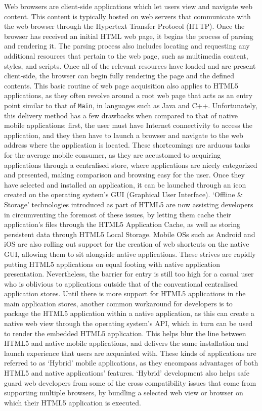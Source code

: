 \documentclass[final]{cmpreport}
\begin{document}
Web browsers are client-side applications which let users view and navigate web content. This content is typically hosted on web servers that communicate with the web browser through the Hypertext Transfer Protocol (HTTP). Once the browser has received an initial HTML web page, it begins the process of parsing and rendering it. The parsing process also includes locating and requesting any additional resources that pertain to the web page, such as multimedia content, styles, and scripts. Once all of the relevant resources have loaded and are present client-side, the browser can begin fully rendering the page and the defined contents. This basic routine of web page acquisition also applies to HTML5 applications, as they often revolve around a root web page that acts as an entry point similar to that of \texttt{Main}, in languages such as Java and C++. Unfortunately, this delivery method has a few drawbacks when compared to that of native mobile applications: first, the user must have Internet connectivity to access the application, and they then have to launch a browser and navigate to the web address where the application is located. These shortcomings are arduous tasks for the average mobile consumer, as they are accustomed to acquiring applications through a centralised store, where applications are nicely categorized and presented, making comparison and browsing easy for the user. Once they have selected and installed an application, it can be launched through an icon created on the operating system's GUI (Graphical User Interface). `Offline \& Storage' technologies introduced as part of HTML5 are now assisting developers in circumventing the foremost of these issues, by letting them cache their application's files through the HTML5 Application Cache, as well as storing persistent data through HTML5 Local Storage. Mobile OSs such as Android and iOS are also rolling out support for the creation of web shortcuts on the native GUI, allowing them to sit alongside native applications. These strives are rapidly putting HTML5 applications on equal footing with native application presentation. Nevertheless, the barrier for entry is still too high for a casual user who is oblivious to applications outside that of the conventional centralised application stores. Until there is more support for HTML5 applications in the main application stores, another common workaround for developers is to package the HTML5 application within a native application, as this can create a native web view through the operating system's API, which in turn can be used to render the embedded HTML5 application. This helps blur the line between HTML5 and native mobile applications, and delivers the same installation and launch experience that users are acquainted with. These kinds of applications are referred to as `Hybrid' mobile applications, as they encompass advantages of both HTML5 and native applications' features. `Hybrid' development also helps safe guard web developers from some of the cross compatibility issues that come from supporting multiple browsers, by bundling a selected web view or browser on which their HTML5 application is executed.
\end{document}
